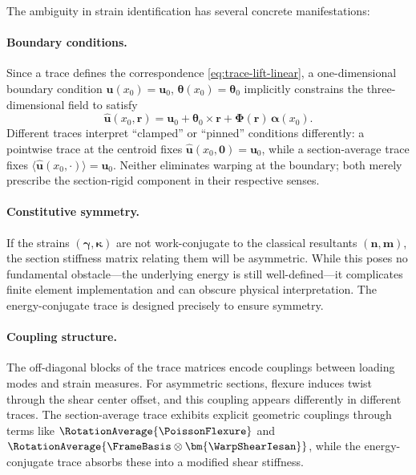 The ambiguity in strain identification has several concrete manifestations:

\paragraph{Boundary conditions.}
Since a trace defines the correspondence \eqref{eq:trace-lift-linear}, a one-dimensional 
boundary condition $\bm{u}(x_0) = \bm{u}_0$, $\bm{\theta}(x_0) = \bm{\theta}_0$ 
implicitly constrains the three-dimensional field to satisfy
\begin{equation}
\hat{\bm{u}}(x_0, \bm{r}) = \bm{u}_0 + \bm{\theta}_0 \times \bm{r} 
+ \bm{\Phi}(\bm{r})\,\bm{\alpha}(x_0).
\label{eq:bc-3d}
\end{equation}
Different traces interpret ``clamped'' or ``pinned'' conditions differently: 
a pointwise trace at the centroid fixes $\hat{\bm{u}}(x_0, \mathbf{0}) = \bm{u}_0$, 
while a section-average trace fixes $\langle\hat{\bm{u}}(x_0, \cdot)\rangle = \bm{u}_0$. 
Neither eliminates warping at the boundary; both merely prescribe the section-rigid component in their respective senses.

\paragraph{Constitutive symmetry.}
If the strains $(\bm{\gamma}, \bm{\kappa})$ are not work-conjugate to the 
classical resultants $(\bm{n}, \bm{m})$, the section stiffness matrix relating 
them will be asymmetric. 
While this poses no fundamental obstacle---the 
underlying energy is still well-defined---it complicates finite element 
implementation and can obscure physical interpretation. The energy-conjugate trace is designed precisely to ensure symmetry.

\paragraph{Coupling structure.}
The off-diagonal blocks of the trace matrices encode couplings between 
loading modes and strain measures. For asymmetric sections, flexure induces 
twist through the shear center offset, and this coupling appears differently 
in different traces. The section-average trace exhibits explicit geometric 
couplings through terms like $\RotationAverage{\PoissonFlexure}$ and 
$\RotationAverage{\FrameBasis \otimes \bm{\WarpShearIesan}}$, while the 
energy-conjugate trace absorbs these into a modified shear stiffness.



